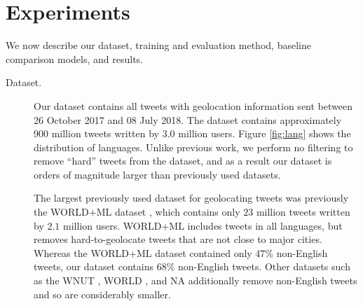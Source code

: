 \documentclass[sigconf,10pt]{acmart}
\renewcommand{\times}{\mathbin{\tikz [x=1.4ex,y=1.4ex,line width=.1ex] \draw (0,0) -- (1,1) (0,1) -- (1,0);}}%
\begin{document}

\section{Experiments}
\label{sec:experiments}

We now describe our dataset, 
training and evaluation method, 
baseline comparison models, 
and results.

\begin{description}

\item[Dataset.]
Our dataset contains all tweets with geolocation information sent between 26 October 2017 and 08 July 2018.
The dataset contains approximately 900 million tweets written by $3.0$ million users.
Figure \ref{fig:lang} shows the distribution of languages.
Unlike previous work, 
we perform no filtering to remove ``hard'' tweets from the dataset,
and as a result our dataset is orders of magnitude larger than previously used datasets.

The largest previously used dataset for geolocating tweets was previously the WORLD+ML dataset \citep{han2014text},
which contains only $23$ million tweets written by $2.1$ million users.
WORLD+ML includes tweets in all languages,
but removes hard-to-geolocate tweets that are not close to major cities.
Whereas the WORLD+ML dataset contained only 47\% non-English tweets,
our dataset contains 68\% non-English tweets.
Other datasets such as the WNUT \citep{han2016twitter}, WORLD \citep{han2012geolocation}, and NA \citep{roller2012supervised}
additionally remove non-English tweets and so are considerably smaller.


\end{description}
\end{document}
